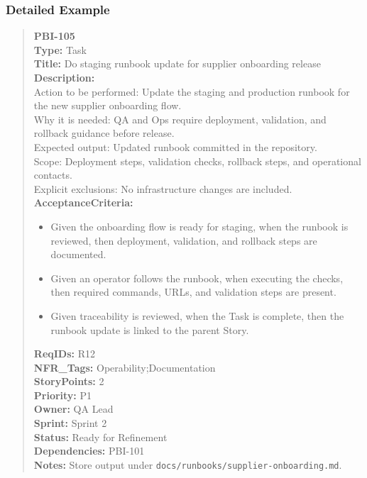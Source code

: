 \documentclass[11pt,a4paper]{article}
\begin{document}
\subsubsection*{Detailed Example}
\begin{quote}
\textbf{PBI-105} \\
\textbf{Type:} Task \\
\textbf{Title:} Do staging runbook update for supplier onboarding release \\

\textbf{Description:} \\
Action to be performed: Update the staging and production runbook for the new supplier onboarding flow. \\
Why it is needed: QA and Ops require deployment, validation, and rollback guidance before release. \\
Expected output: Updated runbook committed in the repository. \\
Scope: Deployment steps, validation checks, rollback steps, and operational contacts. \\
Explicit exclusions: No infrastructure changes are included. \\

\textbf{AcceptanceCriteria:}
\begin{itemize}[leftmargin=1.5em]
    \item Given the onboarding flow is ready for staging, when the runbook is reviewed, then deployment, validation, and rollback steps are documented.
    \item Given an operator follows the runbook, when executing the checks, then required commands, URLs, and validation steps are present.
    \item Given traceability is reviewed, when the Task is complete, then the runbook update is linked to the parent Story.
\end{itemize}

\textbf{ReqIDs:} R12 \\
\textbf{NFR\_Tags:} Operability;Documentation \\
\textbf{StoryPoints:} 2 \\
\textbf{Priority:} P1 \\
\textbf{Owner:} QA Lead \\
\textbf{Sprint:} Sprint 2 \\
\textbf{Status:} Ready for Refinement \\
\textbf{Dependencies:} PBI-101 \\
\textbf{Notes:} Store output under \texttt{docs/runbooks/supplier-onboarding.md}.
\end{quote}
\end{document}
